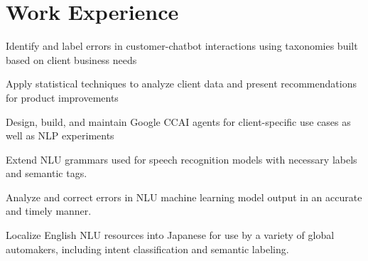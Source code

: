 \documentclass[letterpaper]{deedy-resume_sm} %
\begin{document}

\lastupdated %


\section{Work Experience}
\vspace{\topsep} %
\begin{tightitemize}
\item Identify and label errors in customer-chatbot interactions using taxonomies built based on client business needs
\item Apply statistical techniques to analyze client data and present recommendations for product improvements
\item Design, build, and maintain Google CCAI agents for client-specific use cases as well as NLP experiments
\end{tightitemize}
\sectionspace %
\vspace{\topsep} %
\begin{tightitemize}
\item Extend NLU grammars used for speech recognition models with necessary labels and semantic tags.
\item Analyze and correct errors in NLU machine learning model output in an accurate and timely manner.
\item Localize English NLU resources into Japanese for use by a variety of global automakers, including intent classification and semantic labeling.   
\end{tightitemize}
\end{document}
